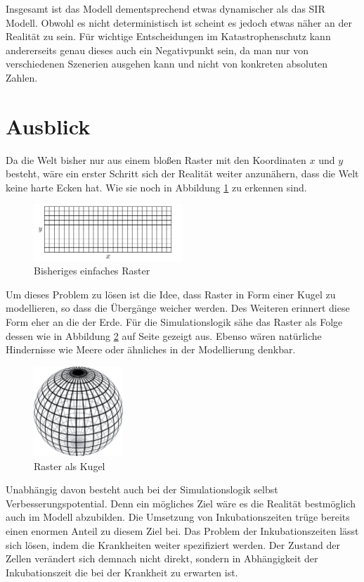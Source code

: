 \documentclass[10pt,twocolumn]{scrartcl}
\begin{document}
Insgesamt ist das Modell dementsprechend etwas dynamischer als das SIR Modell. Obwohl es nicht deterministisch ist scheint es jedoch etwas näher an der Realität zu sein. Für wichtige Entscheidungen im Katastrophenschutz kann andererseits genau dieses auch ein Negativpunkt sein, da man nur von verschiedenen Szenerien ausgehen kann und nicht von konkreten absoluten Zahlen.

\section*{Ausblick}
Da die Welt bisher nur aus einem bloßen Raster mit den Koordinaten $x$ und $y$ besteht, wäre ein erster Schritt sich der Realität weiter anzunähern, dass die Welt keine harte Ecken hat. Wie sie noch in Abbildung \ref{fig:welt} zu erkennen sind.
\begin{figure}[H]
	\centering
	\includegraphics[width= 0.5\textwidth]{./images/map.png}
	\caption{Bisheriges einfaches Raster}
	\label{fig:welt}
\end{figure}
Um dieses Problem zu lösen ist die Idee, dass Raster in Form einer Kugel zu modellieren, so dass die Übergänge weicher werden. Des Weiteren erinnert diese Form eher an die der Erde. Für die Simulationslogik sähe das Raster als Folge dessen wie in Abbildung \ref{fig:kugel} auf Seite \pageref{fig:kugel} gezeigt aus. Ebenso wären natürliche Hindernisse wie Meere oder ähnliches in der Modellierung denkbar.
\begin{figure}[H]
	\centering
	\includegraphics[width= 0.3\textwidth]{./images/kugel.pdf}
	\caption{Raster als Kugel \cite{WikiKugel:2014}}
	\label{fig:kugel}
\end{figure}


Unabhängig davon besteht auch bei der Simulationslogik selbst Verbesserungspotential. Denn ein mögliches Ziel wäre es die Realität bestmöglich auch im Modell abzubilden.
Die Umsetzung von Inkubationszeiten trüge bereits einen enormen Anteil zu diesem Ziel bei. 
Das Problem der Inkubationszeiten lässt sich lösen, indem die Krankheiten weiter spezifiziert werden. Der Zustand der Zellen verändert sich demnach nicht direkt, sondern in Abhängigkeit der Inkubationszeit die bei der Krankheit zu erwarten ist.
\end{document}
